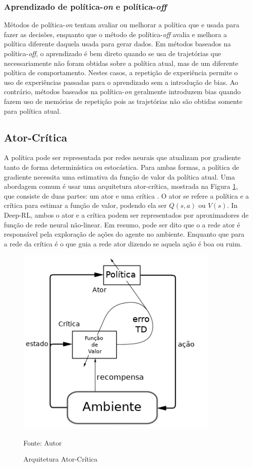 \subsubsection{Aprendizado de política-\textit{on} e política-\textit{off}}

Métodos de política-\textit{on} tentam avaliar ou melhorar a política que e usada para fazer as decisões, enquanto que o método de política-\textit{off} avalia e melhora a política diferente daquela usada para gerar dados. Em métodos baseados na política-\textit{off}, o aprendizado é bem direto quando se usa de trajetórias que necessariamente não foram obtidas sobre a política atual, mas de um diferente política de comportamento.
Nestes casos, a repetição de experiência permite o uso de experiências passadas para o aprendizado sem a introdução de bias. Ao contrário, métodos baseados na política-\textit{on} geralmente introduzem bias quando fazem uso de memórias de repetição pois as trajetórias não são obtidas somente para política atual.




\subsection{Ator-Crítica}

A política pode ser representada por redes neurais que atualizam por gradiente tanto de forma determinística ou estocástica. Para ambas formas, a política de gradiente necessita uma estimativa da função de valor da política atual. 
Uma abordagem comum é usar uma arquitetura ator-crítica, mostrada na Figura \ref{fig:actor_critic}, que consiste de duas partes: um ator e uma crítica \cite{konda2000actor}.
O ator se refere a política e a crítica para estimar a função de valor, podendo ela ser $Q(s,a)$ ou $V(s)$.
In Deep-RL, ambos o ator e a crítica podem  ser representados por aproximadores de função de rede neural não-linear.
Em resumo, pode ser dito que o a rede ator é responsável pela exploração de ações do agente no ambiente. Enquanto que para a rede da crítica é o que guia a rede ator dizendo se aquela ação é boa ou ruim. 

\begin{figure}[H]
\caption{Arquitetura Ator-Crítica}
\centerline{\includegraphics[width=10cm]{imagens/actor-critic_portuguese.png}}
\small{Fonte: Autor}
\label{fig:actor_critic}
\end{figure}
